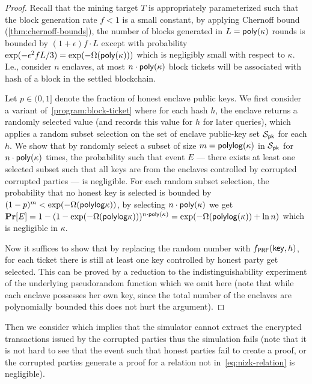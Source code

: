 \begin{proof}
	Recall that the mining target $T$ is appropriately parameterized such that the block generation rate $f < 1$ is a small constant, by applying Chernoff bound (\cref{thm:chernoff-bounds}), the number of blocks generated in $L = \mathsf{poly}(\kappa)$ rounds is bounded by $(1 + \epsilon)f \cdot L$ except with probability $\exp(- \epsilon^2 f L / 3) = \exp(-\Omega(\mathsf{poly}(\kappa)))$ which is negligibly small with respect to $\kappa$.
	I.e., consider $n$ enclaves, at most $n \cdot \mathsf{poly}(\kappa)$ block tickets will be associated with hash of a block in the settled blockchain.

	Let $p \in (0 ,1]$ denote the fraction of honest enclave public keys.
	We first consider a variant of~\cref{program:block-ticket} where for each hash $h$, the enclave returns a randomly selected value (and records this value for $h$ for later queries), which applies a random subset selection on the set of enclave public-key set $\mathcal{S}_\mathsf{pk}$ for each $h$.
	We show that by randomly select a subset of size $m = \mathsf{polylog} (\kappa)$ in $\mathcal{S}_\mathsf{pk}$ for $n \cdot \mathsf{poly}(\kappa)$ times, the probability such that event $E$ --- there exists at least one selected subset such that all keys are from the enclaves controlled by corrupted corrupted parties --- is negligible.
	For each random subset selection, the probability that no honest key is selected is bounded by $(1 - p)^m < \exp(-\Omega(\mathsf{polylog}\kappa))$, by selecting $n \cdot \mathsf{poly}(\kappa)$ we get $\mathbf{Pr}[E] = 1 - (1 - \exp(-\Omega(\mathsf{polylog}\kappa)))^{n \cdot \mathsf{poly}(\kappa)} = \exp(-\Omega(\mathsf{polylog}(\kappa)) + \ln n)$ which is negligible in $\kappa$.

	Now it suffices to show that by replacing the random number with $f_\mathsf{PRF}(\mathsf{key}, h)$, for each ticket there is still at least one key controlled by honest party get selected.
	This can be proved by a reduction to the indistinguishability experiment of the underlying pseudorandom function \fPRF which we omit here (note that while each enclave possesses her own key, since the total number of the enclaves are polynomially bounded this does not hurt the argument).
\end{proof}

Then we consider \badNIZK which implies that the simulator \simulator cannot extract the encrypted transactions issued by the corrupted parties thus the simulation fails (note that it is not hard to see that the event such that honest parties fail to create a proof, or the corrupted parties generate a proof for a relation not in~\cref{eq:nizk-relation} is negligible).

